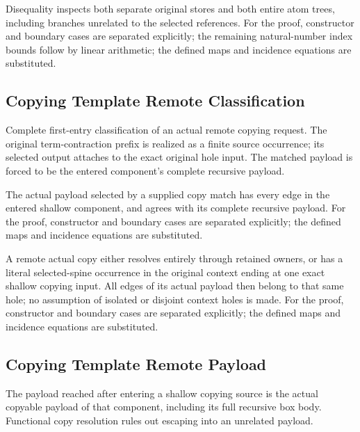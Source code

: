 Disequality inspects both separate original stores and both entire atom trees, including branches unrelated to the selected references.
For the proof, constructor and boundary cases are separated explicitly; the remaining natural-number index bounds follow by linear arithmetic; the defined maps and incidence equations are substituted.
\par{}

\subsection{Copying Template Remote Classification}
Complete first-entry classification of an actual remote copying request. The original term-contraction prefix is realized as a finite source occurrence; its selected output attaches to the exact original hole input. The matched payload is forced to be the entered component's complete recursive payload.

The actual payload selected by a supplied copy match has every edge in the entered shallow component, and agrees with its complete recursive payload.
For the proof, constructor and boundary cases are separated explicitly; the defined maps and incidence equations are substituted.
\par{}

A remote actual copy either resolves entirely through retained owners, or has a literal selected-spine occurrence in the original context ending at one exact shallow copying input. All edges of its actual payload then belong to that same hole; no assumption of isolated or disjoint context holes is made.
For the proof, constructor and boundary cases are separated explicitly; the defined maps and incidence equations are substituted.
\par{}

\subsection{Copying Template Remote Payload}
The payload reached after entering a shallow copying source is the actual copyable payload of that component, including its full recursive box body. Functional copy resolution rules out escaping into an unrelated payload.

